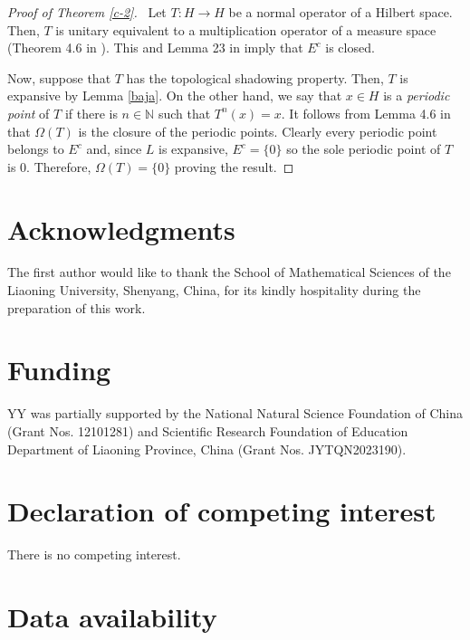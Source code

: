 \documentclass[11pt,letterpaper]{amsart}
\numberwithin{equation}{section}
\begin{document}
\begin{proof}[Proof of Theorem \ref{c-2}]\,
Let $T:H\to H$ be a normal operator of a Hilbert space.
Then, $T$ is unitary equivalent to a multiplication operator of a measure space
(Theorem 4.6 in \cite{con}). This and Lemma 23 in \cite{lm} imply that $E^c$ is closed.

Now, suppose that $T$ has the topological shadowing property.
Then,
$T$ is expansive by Lemma \ref{baja}.
On the other hand, we say that $x\in H$ is a {\em periodic point} of $T$ if there is $n\in\mathbb{N}$ such that $T^n(x)=x$.
It follows from Lemma 4.6 in \cite{lny} that $\Omega(T)$ is the closure of the periodic points. Clearly every periodic point belongs to $E^c$ and, since $L$ is expansive, $E^c=\{0\}$ so the sole periodic point of $T$ is $0$. Therefore,
$\Omega(T)=\{0\}$ proving the result.
\end{proof}





\noindent




\section*{Acknowledgments}

\noindent
The first author would like to thank the School of Mathematical Sciences of the
Liaoning University, Shenyang, China, for its kindly hospitality during the preparation of this work.




\section*{Funding}


\noindent
YY was partially supported by the National Natural Science Foundation of China (Grant Nos. 12101281) and Scientific Research Foundation of Education Department of Liaoning Province, China (Grant Nos. JYTQN2023190).






\section*{Declaration of competing interest}

\noindent
There is no competing interest.


\section*{Data availability}
\end{document}
